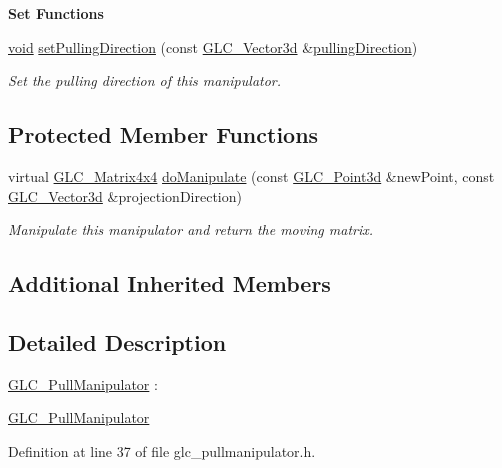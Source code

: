 \begin{Indent}{\bf Set Functions}\par
\begin{DoxyCompactItemize}
\item 
\hyperlink{group___u_a_v_objects_plugin_ga444cf2ff3f0ecbe028adce838d373f5c}{void} \hyperlink{class_g_l_c___pull_manipulator_a492c2ac7ef4f38f63f7a01e0dd0d5f0a}{set\-Pulling\-Direction} (const \hyperlink{class_g_l_c___vector3d}{G\-L\-C\-\_\-\-Vector3d} \&\hyperlink{class_g_l_c___pull_manipulator_af11fb912703430dd6559dea2deb00f8e}{pulling\-Direction})
\begin{DoxyCompactList}\small\item\em Set the pulling direction of this manipulator. \end{DoxyCompactList}\end{DoxyCompactItemize}
\end{Indent}
\subsection*{Protected Member Functions}
\begin{DoxyCompactItemize}
\item 
virtual \hyperlink{class_g_l_c___matrix4x4}{G\-L\-C\-\_\-\-Matrix4x4} \hyperlink{class_g_l_c___pull_manipulator_a36b298b60e100d9a40ce907d320c9d0d}{do\-Manipulate} (const \hyperlink{glc__vector3d_8h_a4e13a9bbc7ab3d34de7e98b41836772c}{G\-L\-C\-\_\-\-Point3d} \&new\-Point, const \hyperlink{class_g_l_c___vector3d}{G\-L\-C\-\_\-\-Vector3d} \&projection\-Direction)
\begin{DoxyCompactList}\small\item\em Manipulate this manipulator and return the moving matrix. \end{DoxyCompactList}\end{DoxyCompactItemize}
\subsection*{Additional Inherited Members}


\subsection{Detailed Description}
\hyperlink{class_g_l_c___pull_manipulator}{G\-L\-C\-\_\-\-Pull\-Manipulator} \-: 

\hyperlink{class_g_l_c___pull_manipulator}{G\-L\-C\-\_\-\-Pull\-Manipulator} 

Definition at line 37 of file glc\-\_\-pullmanipulator.\-h.



